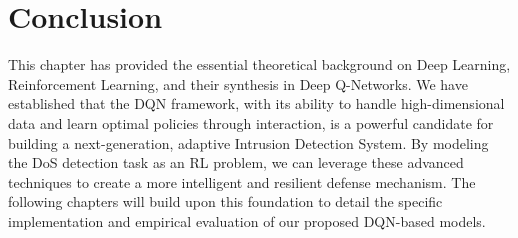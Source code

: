 \documentclass{report}
\begin{document}
\section{Conclusion}
This chapter has provided the essential theoretical background on Deep Learning, Reinforcement Learning, and their synthesis in Deep Q-Networks. We have established that the DQN framework, with its ability to handle high-dimensional data and learn optimal policies through interaction, is a powerful candidate for building a next-generation, adaptive Intrusion Detection System. By modeling the DoS detection task as an RL problem, we can leverage these advanced techniques to create a more intelligent and resilient defense mechanism. The following chapters will build upon this foundation to detail the specific implementation and empirical evaluation of our proposed DQN-based models.



\end{document}
